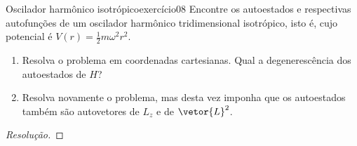 \begin{exercício}{Oscilador harmônico isotrópico}{exercício08}
    Encontre os autoestados e respectivas autofunções de um oscilador harmônico tridimensional isotrópico, isto é, cujo potencial é \(V(r) = \frac12 m \omega^2 r^2\).
    \begin{enumerate}[label=(\alph*)]
        \item Resolva o problema em coordenadas cartesianas. Qual a degenerescência dos autoestados de \(H\)?
        \item Resolva novamente o problema, mas desta vez imponha que os autoestados também são autovetores de \(L_z\) e de \(\vetor{L}^2\).
    \end{enumerate}
\end{exercício}
\begin{proof}[Resolução]

\end{proof}
